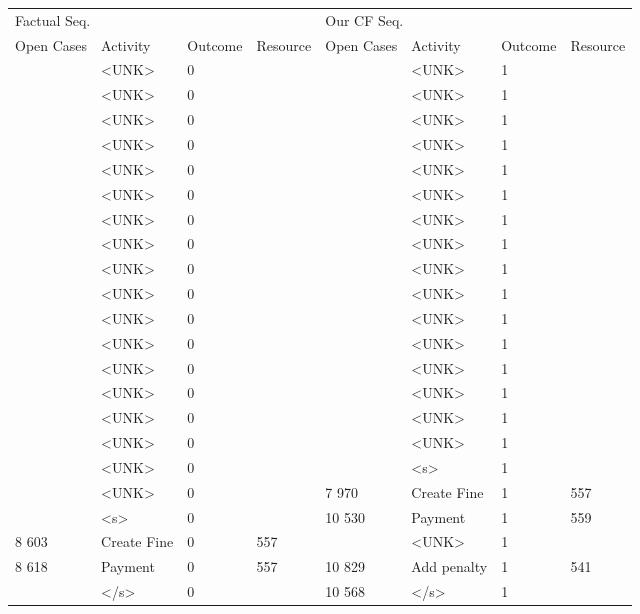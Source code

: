 \begin{tabular}{llllllll}
\toprule
\multicolumn{4}{l}{Factual Seq.} & \multicolumn{4}{l}{Our CF Seq.} \\
Open Cases & Activity & Outcome & Resource & Open Cases & Activity & Outcome & Resource \\
\midrule
 & <UNK> & 0 &  &  & <UNK> & 1 &  \\
 & <UNK> & 0 &  &  & <UNK> & 1 &  \\
 & <UNK> & 0 &  &  & <UNK> & 1 &  \\
 & <UNK> & 0 &  &  & <UNK> & 1 &  \\
 & <UNK> & 0 &  &  & <UNK> & 1 &  \\
 & <UNK> & 0 &  &  & <UNK> & 1 &  \\
 & <UNK> & 0 &  &  & <UNK> & 1 &  \\
 & <UNK> & 0 &  &  & <UNK> & 1 &  \\
 & <UNK> & 0 &  &  & <UNK> & 1 &  \\
 & <UNK> & 0 &  &  & <UNK> & 1 &  \\
 & <UNK> & 0 &  &  & <UNK> & 1 &  \\
 & <UNK> & 0 &  &  & <UNK> & 1 &  \\
 & <UNK> & 0 &  &  & <UNK> & 1 &  \\
 & <UNK> & 0 &  &  & <UNK> & 1 &  \\
 & <UNK> & 0 &  &  & <UNK> & 1 &  \\
 & <UNK> & 0 &  &  & <UNK> & 1 &  \\
 & <UNK> & 0 &  &  & <s> & 1 &  \\
 & <UNK> & 0 &  & 7 970 & Create Fine & 1 & 557 \\
 & <s> & 0 &  & 10 530 & Payment & 1 & 559 \\
8 603 & Create Fine & 0 & 557 &  & <UNK> & 1 &  \\
8 618 & Payment & 0 & 557 & 10 829 & Add penalty & 1 & 541 \\
 & </s> & 0 &  & 10 568 & </s> & 1 &  \\
\bottomrule
\end{tabular}
